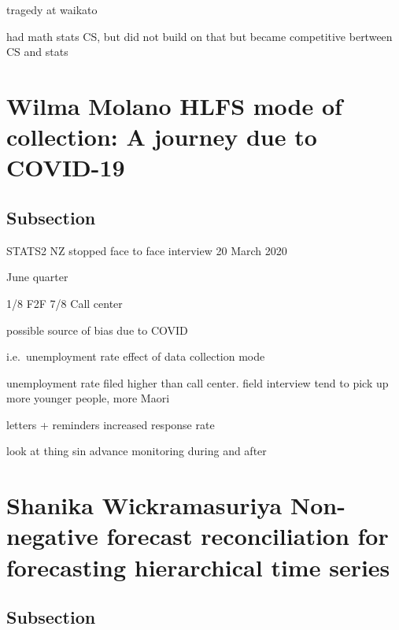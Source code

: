 \documentclass[
]{book}
\begin{document}
tragedy at waikato

had math stats CS, but did not build on that but became competitive bertween CS and stats

\hypertarget{wilma-molano-hlfs-mode-of-collection-a-journey-due-to-covid-19}{%
\chapter*{Wilma Molano \textbar{} HLFS mode of collection: A journey due to COVID-19}\label{wilma-molano-hlfs-mode-of-collection-a-journey-due-to-covid-19}}

\hypertarget{subsection}{%
\section{Subsection}\label{subsection}}

STATS2 NZ stopped face to face interview 20 March 2020

June quarter

1/8 F2F
7/8 Call center

possible source of bias due to COVID

i.e.~unemployment rate
effect of data collection mode

unemployment rate filed higher than call center. field interview tend to pick up more younger people, more Maori

letters + reminders increased response rate

look at thing sin advance
monitoring during and after

\hypertarget{shanika-wickramasuriya-non-negative-forecast-reconciliation-for-forecasting-hierarchical-time-series}{%
\chapter*{Shanika Wickramasuriya \textbar{} Non-negative forecast reconciliation for forecasting hierarchical time series}\label{shanika-wickramasuriya-non-negative-forecast-reconciliation-for-forecasting-hierarchical-time-series}}

\hypertarget{subsection}{%
\section{Subsection}\label{subsection}}
\end{document}

